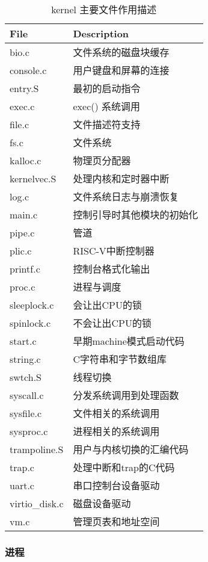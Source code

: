 \begin{table}[!hpt]
	\caption{kernel 主要文件作用描述}
	\label{tab:xv6_files}
	\centering
	\begin{tabular}{@{}ll@{}} 		
		\toprule
		\textbf{File} & \textbf{Description} \\
		\midrule
		bio.c         & 文件系统的磁盘块缓存 \\
		console.c     & 用户键盘和屏幕的连接 \\
		entry.S       & 最初的启动指令 \\
		exec.c        & exec() 系统调用 \\
		file.c        & 文件描述符支持 \\
		fs.c          & 文件系统 \\
		kalloc.c      & 物理页分配器 \\
		kernelvec.S   & 处理内核和定时器中断 \\
		log.c         & 文件系统日志与崩溃恢复 \\
		main.c        & 控制引导时其他模块的初始化 \\
		pipe.c        & 管道 \\
		plic.c        & RISC-V中断控制器 \\
		printf.c      & 控制台格式化输出 \\
		proc.c        & 进程与调度 \\
		sleeplock.c   & 会让出CPU的锁 \\
		spinlock.c    & 不会让出CPU的锁 \\
		start.c       & 早期machine模式启动代码 \\
		string.c      & C字符串和字节数组库 \\
		swtch.S       & 线程切换 \\
		syscall.c     & 分发系统调用到处理函数 \\
		sysfile.c     & 文件相关的系统调用 \\
		sysproc.c     & 进程相关的系统调用 \\
		trampoline.S  & 用户与内核切换的汇编代码 \\ 
		trap.c        & 处理中断和trap的C代码 \\
		uart.c        & 串口控制台设备驱动 \\
		virtio\_disk.c & 磁盘设备驱动 \\
		vm.c          & 管理页表和地址空间 \\
		\bottomrule
	\end{tabular}
\end{table}

\subsubsection{进程}


